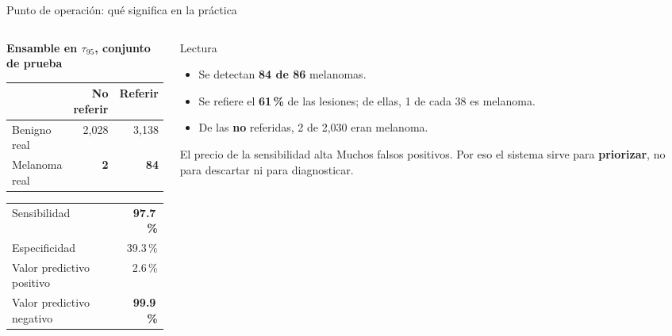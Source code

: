 \documentclass[aspectratio=169,10pt]{beamer}
\begin{document}
\begin{frame}{Punto de operación: qué significa en la práctica}
  \begin{columns}[c]
    \begin{column}{0.46\textwidth}
      \centering
      \small
      \textbf{Ensamble en $\tau_{95}$, conjunto de prueba}\\[0.5em]
      \begin{tabular}{lrr}
        \toprule
        & \textbf{No referir} & \textbf{Referir} \\
        \midrule
        Benigno real & 2,028 & 3,138 \\
        Melanoma real & \textbf{2} & \textbf{84} \\
        \bottomrule
      \end{tabular}
      \vspace{0.8em}

      \begin{tabular}{lr}
        \toprule
        Sensibilidad & \textbf{97.7\,\%} \\
        Especificidad & 39.3\,\% \\
        Valor predictivo positivo & 2.6\,\% \\
        Valor predictivo negativo & \textbf{99.9\,\%} \\
        \bottomrule
      \end{tabular}
    \end{column}
    \begin{column}{0.50\textwidth}
      \begin{block}{Lectura}
        \begin{itemize}
          \item Se detectan \textbf{84 de 86} melanomas.
          \item Se refiere el \textbf{61\,\%} de las lesiones; de ellas, 1 de cada 38 es melanoma.
          \item De las \textbf{no} referidas, 2 de 2,030 eran melanoma.
        \end{itemize}
      \end{block}
      \begin{alertblock}{El precio de la sensibilidad alta}
        Muchos falsos positivos. Por eso el sistema sirve para \textbf{priorizar}, no para descartar ni para diagnosticar.
      \end{alertblock}
    \end{column}
  \end{columns}
\end{frame}
\end{document}
